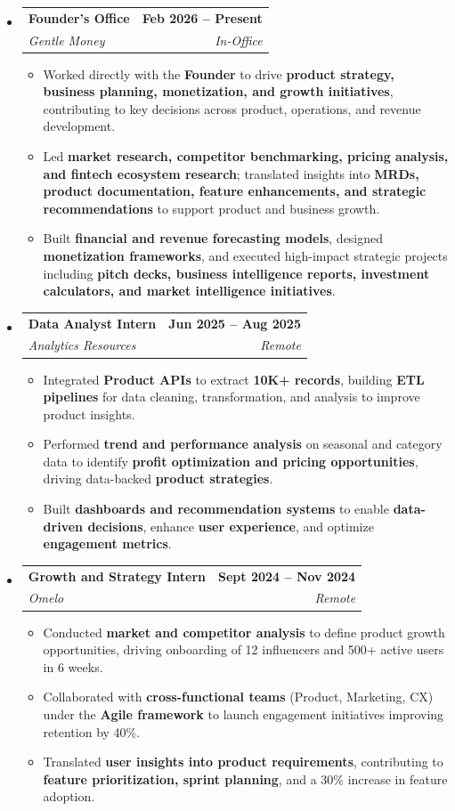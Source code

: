 \documentclass[letterpaper,11pt]{article}
\makeatletter
\newcommand{\resumeItem}[1]{
  \item\small{
    {#1 \vspace{-2pt}}
  }
}
\newcommand{\resumeSubheading}[4]{
  \vspace{-2pt}\item
    \begin{tabular*}{1.0\textwidth}[t]{l@{\extracolsep{\fill}}r}
      \textbf{#1} & \textbf{\small #2} \\
      \textit{\small#3} & \textit{\small #4} \\
    \end{tabular*}\vspace{-7pt}
}
\newcommand{\resumeSubHeadingListStart}{\begin{itemize}[leftmargin=0.0in, label={}]}
\newcommand{\resumeSubHeadingListEnd}{\end{itemize}}
\newcommand{\resumeItemListStart}{\begin{itemize}}
\newcommand{\resumeItemListEnd}{\end{itemize}\vspace{-5pt}}
\makeatother
\begin{document}
\resumeSubHeadingListStart
\resumeSubheading
{Founder's Office}{Feb 2026 -- Present}
{Gentle Money}{In-Office}
\resumeItemListStart
\resumeItem{Worked directly with the \textbf{Founder} to drive \textbf{product strategy, business planning, monetization, and growth initiatives}, contributing to key decisions across product, operations, and revenue development.}
\resumeItem{Led \textbf{market research, competitor benchmarking, pricing analysis, and fintech ecosystem research}; translated insights into \textbf{MRDs, product documentation, feature enhancements, and strategic recommendations} to support product and business growth.}
\resumeItem{Built \textbf{financial and revenue forecasting models}, designed \textbf{monetization frameworks}, and executed high-impact strategic projects including \textbf{pitch decks, business intelligence reports, investment calculators, and market intelligence initiatives}.}
\resumeItemListEnd
\resumeSubHeadingListEnd

\vspace{-9pt}
\resumeSubHeadingListStart
\resumeSubheading
{Data Analyst Intern}{Jun 2025 -- Aug 2025}
{Analytics Resources}{Remote}
\resumeItemListStart
\resumeItem{Integrated \textbf{Product APIs} to extract \textbf{10K+ records}, building \textbf{ETL pipelines} for data cleaning, transformation, and analysis to improve product insights.}
\resumeItem{Performed \textbf{trend and performance analysis} on seasonal and category data to identify \textbf{profit optimization and pricing opportunities}, driving data-backed \textbf{product strategies}.}
\resumeItem{Built \textbf{dashboards and recommendation systems} to enable \textbf{data-driven decisions}, enhance \textbf{user experience}, and optimize \textbf{engagement metrics}.}
\resumeItemListEnd
\resumeSubHeadingListEnd

\vspace{-9pt}
\resumeSubHeadingListStart
\resumeSubheading
{Growth and Strategy Intern}{Sept 2024 -- Nov 2024}
{Omelo}{Remote}
\resumeItemListStart
\resumeItem{Conducted \textbf{market and competitor analysis} to define product growth opportunities, driving onboarding of 12 influencers and 500+ active users in 6 weeks.}
\resumeItem{Collaborated with \textbf{cross-functional teams} (Product, Marketing, CX) under the \textbf{Agile framework} to launch engagement initiatives improving retention by 40\%.}
\resumeItem{Translated \textbf{user insights into product requirements}, contributing to \textbf{feature prioritization, sprint planning}, and a 30\% increase in feature adoption.}
\resumeItemListEnd
\resumeSubHeadingListEnd
\end{document}
